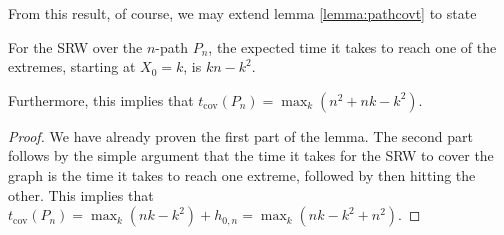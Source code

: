 	From this result, of course, we may extend lemma \ref{lemma:pathcovt} to state
	\begin{lemma}
		\label{lemma:pathcovtext}
		For the SRW over the $n$-path $P_n$, the expected time it takes to reach one of the
		extremes, starting at $X_0 = k$, is $kn - k^2$. \par
		Furthermore, this implies that $t_\mathrm{cov}(P_n) = \max_k(n^2 +nk -k^2)$.
	\end{lemma}
	\begin{proof}
		We have already proven the first part of the lemma. The second part follows by the
		simple argument that the time it takes for the SRW to cover the graph is the time
		it takes to reach one extreme, followed by then hitting the other. This implies 
		that $t_\mathrm{cov}(P_n) = \max_k(nk-k^2) + h_{0,n} = \max_{k}(nk-k^2+n^2)$.
	\end{proof}
